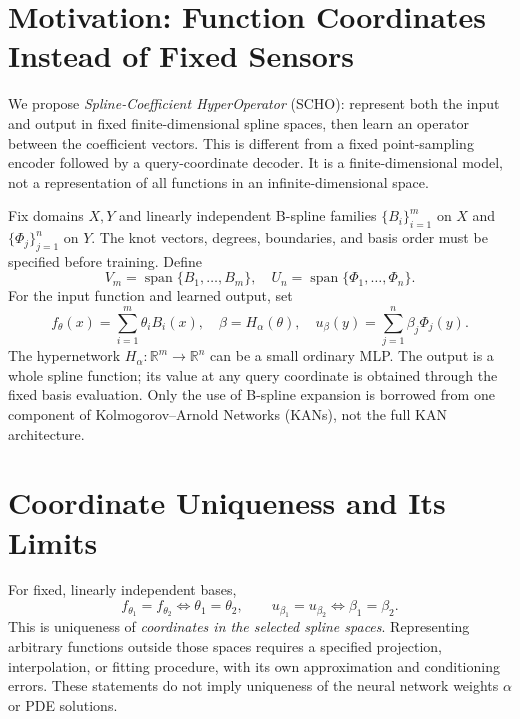 



\section{Motivation: Function Coordinates Instead of Fixed Sensors}
\label{sec:scho-motivation}

We propose \emph{Spline-Coefficient HyperOperator} (SCHO): represent both
the input and output in fixed finite-dimensional spline spaces, then
learn an operator between the coefficient vectors. This is different
from a fixed point-sampling encoder followed by a query-coordinate
decoder. It is a finite-dimensional model, not a representation of
all functions in an infinite-dimensional space.

Fix domains $X,Y$ and linearly independent B-spline families
$\{B_i\}_{i=1}^{m}$ on $X$ and $\{\Phi_j\}_{j=1}^{n}$ on $Y$.
The knot vectors, degrees, boundaries, and basis order must be specified
before training. Define
\begin{equation}
  V_m=\operatorname{span}\{B_1,\ldots,B_m\},\quad
  U_n=\operatorname{span}\{\Phi_1,\ldots,\Phi_n\}.
  \label{eq:scho-spaces}
\end{equation}
For the input function and learned output, set
\begin{equation}
  f_\theta(x)=\sum_{i=1}^{m}\theta_i B_i(x),\quad
  \beta=H_\alpha(\theta),\quad
  u_\beta(y)=\sum_{j=1}^{n}\beta_j\Phi_j(y).
  \label{eq:scho-base}
\end{equation}
The hypernetwork $H_\alpha:\mathbb R^m\to\mathbb R^n$ can be a small
ordinary MLP. The output is a whole spline function; its value at
any query coordinate is obtained through the fixed basis evaluation.
Only the use of B-spline expansion is borrowed from one component of
Kolmogorov--Arnold Networks (KANs), not the full KAN architecture.




\section{Coordinate Uniqueness and Its Limits}
\label{sec:scho-uniqueness}

For fixed, linearly independent bases,
\begin{equation}
  f_{\theta_1}=f_{\theta_2}\iff\theta_1=\theta_2,\qquad
  u_{\beta_1}=u_{\beta_2}\iff\beta_1=\beta_2.
  \label{eq:scho-unique}
\end{equation}
This is uniqueness of \emph{coordinates in the selected spline spaces}.
Representing arbitrary functions outside those spaces requires a
specified projection, interpolation, or fitting procedure, with its own
approximation and conditioning errors. These statements do not imply
uniqueness of the neural network weights $\alpha$ or PDE solutions.

